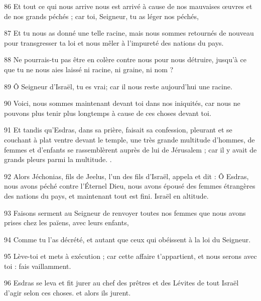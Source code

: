 \par 86 Et tout ce qui nous arrive nous est arrivé à cause de nos mauvaises œuvres et de nos grands péchés ; car toi, Seigneur, tu as léger nos péchés,
\par 87 Et tu nous as donné une telle racine, mais nous sommes retournés de nouveau pour transgresser ta loi et nous mêler à l'impureté des nations du pays.
\par 88 Ne pourrais-tu pas être en colère contre nous pour nous détruire, jusqu'à ce que tu ne nous aies laissé ni racine, ni graine, ni nom ?
\par 89 Ô Seigneur d'Israël, tu es vrai; car il nous reste aujourd'hui une racine.
\par 90 Voici, nous sommes maintenant devant toi dans nos iniquités, car nous ne pouvons plus tenir plus longtemps à cause de ces choses devant toi.
\par 91 Et tandis qu'Esdras, dans sa prière, faisait sa confession, pleurant et se couchant à plat ventre devant le temple, une très grande multitude d'hommes, de femmes et d'enfants se rassemblèrent auprès de lui de Jérusalem ; car il y avait de grands pleurs parmi la multitude. .
\par 92 Alors Jéchonias, fils de Jeelus, l'un des fils d'Israël, appela et dit : Ô Esdras, nous avons péché contre l'Éternel Dieu, nous avons épousé des femmes étrangères des nations du pays, et maintenant tout est fini. Israël en altitude.
\par 93 Faisons serment au Seigneur de renvoyer toutes nos femmes que nous avons prises chez les païens, avec leurs enfants,
\par 94 Comme tu l'as décrété, et autant que ceux qui obéissent à la loi du Seigneur.
\par 95 Lève-toi et mets à exécution ; car cette affaire t'appartient, et nous serons avec toi : fais vaillamment.
\par 96 Esdras se leva et fit jurer au chef des prêtres et des Lévites de tout Israël d'agir selon ces choses. et alors ils jurent.


